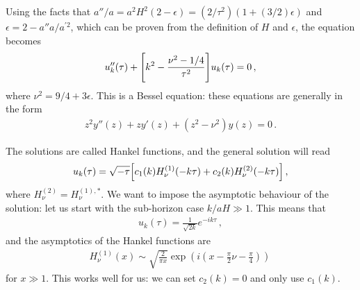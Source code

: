 \documentclass[main.tex]{subfiles}
\begin{document}
Using the facts that \(a'' / a = a^2 H^2 (2- \epsilon ) = (2 /\tau^2) (1 + (3/2) \epsilon )\) and \(\epsilon = 2 - a'' a / a^{\prime 2}\), which can be proven from the definition of \(H\) and \(\epsilon \), the equation becomes 
%
\begin{align}
u''_k(\tau ) + \qty[k^2 - \frac{\nu^2 - 1/4}{\tau^2}] u_k (\tau )= 0 
\,,
\end{align}
%
where \(\nu^2 = 9/4 + 3 \epsilon \). 
This is a Bessel equation: these equations are generally in the form 
%
\begin{align}
z^2 y'' (z) + z y' (z) + (z^2 - \nu^2) y(z) = 0
\,.
\end{align}

The solutions are called Hankel functions, and the general solution will read 
%
\begin{align}
u_k (\tau ) = \sqrt{- \tau } \qty[ c_1 (k) H_\nu^{(1)} (-k\tau ) + c_2 (k) H_\nu^{(2)} (-k\tau )]
\,,
\end{align}
%
where \(H^{(2)}_\nu = H^{(1), *}_\nu\). 
We want to impose the asymptotic behaviour of the solution: let us start with the sub-horizon case \(k / aH \gg 1\). 
This means that 
%
\begin{align}
u_k (\tau ) = \frac{1}{\sqrt{2k}} e^{-ik \tau }
\,,
\end{align}
%
and the asymptotics of the Hankel functions are
%
\begin{align}
H^{(1)}_\nu  (x) \sim \sqrt{ \frac{2}{\pi x}} \exp(i (x - \frac{\pi}{2} \nu - \frac{\pi}{4}))
\,
\end{align}
%
for \(x \gg 1\). This works well for us: we can set \(c_2 (k) = 0\) and only use \(c_1 (k)\). 
\end{document}
